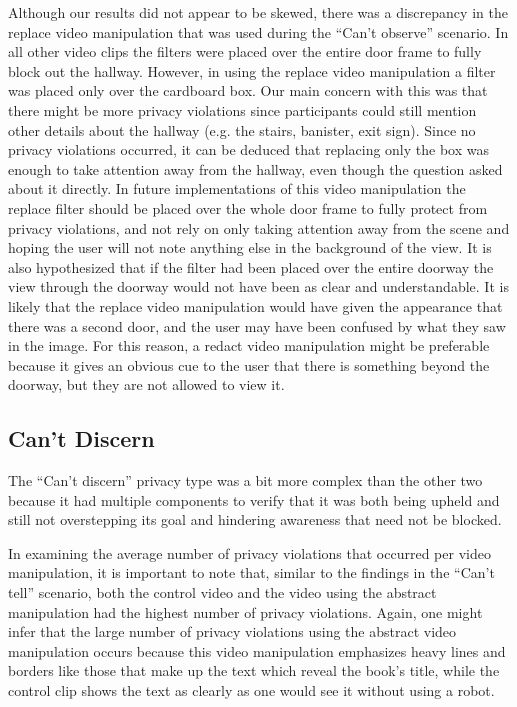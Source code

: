 \documentclass{acm_proc_article-sp}
\begin{document}
Although our results did not appear to be skewed, there was a discrepancy in the replace video manipulation that was used during the ``Can't observe'' scenario. In all other video clips the filters were placed over the entire door frame to fully block out the hallway. However, in using the replace video manipulation a filter was placed only over the cardboard box. Our main concern with this was that there might be more privacy violations since participants could still mention other details about the hallway (e.g. the stairs, banister, exit sign). Since no privacy violations occurred, it can be deduced that replacing only the box was enough to take attention away from the hallway, even though the question asked about it directly. In future implementations of this video manipulation the replace filter should be placed over the whole door frame to fully protect from privacy violations, and not rely on only taking attention away from the scene and hoping the user will not note anything else in the background of the view. It is also hypothesized that if the filter had been placed over the entire doorway the view through the doorway would not have been as clear and understandable. It is likely that the replace video manipulation would have given the appearance that there was a second door, and the user may have been confused by what they saw in the image. For this reason, a redact video manipulation might be preferable because it gives an obvious cue to the user that there is something beyond the doorway, but they are not allowed to view it. 

\subsection{Can't Discern}
The ``Can't discern'' privacy type was a bit more complex than the other two because it had multiple components to verify that it was both being upheld and still not overstepping its goal and hindering awareness that need not be blocked.

 In examining the average number of privacy violations that occurred per video manipulation, it is important to note that, similar to the findings in the ``Can't tell'' scenario, both the control video and the video using the abstract manipulation had the highest number of privacy violations. Again, one might infer that the large number of privacy violations using the abstract video manipulation occurs because this video manipulation emphasizes heavy lines and borders like those that make up the text which reveal the book's title, while the control clip shows the text as clearly as one would see it without using a robot. 
\end{document}
